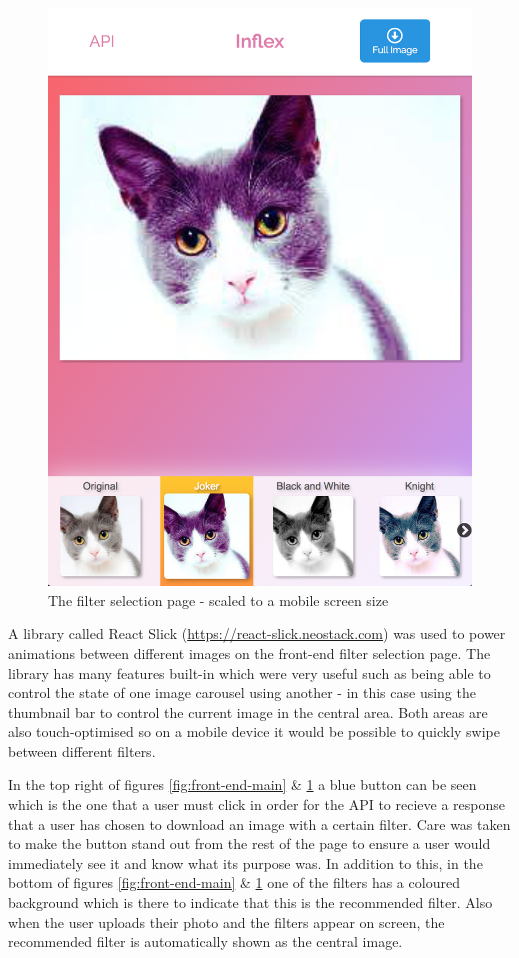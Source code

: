 \documentclass[a4paper,12pt]{report}
\begin{document}
    \begin{figure}[h]
      \centering
      \includegraphics[width=0.5\linewidth]{front-end-mobile}
      \caption{The filter selection page - scaled to a mobile screen size}
      \label{fig:front-end-mobile}
    \end{figure}

    A library called React Slick (\url{https://react-slick.neostack.com}) was used to power animations between different images on the front-end filter selection page. The library has many features built-in which were very useful such as being able to control the state of one image carousel using another - in this case using the thumbnail bar to control the current image in the central area. Both areas are also touch-optimised so on a mobile device it would be possible to quickly swipe between different filters.

    In the top right of figures \ref{fig:front-end-main} \& \ref{fig:front-end-mobile} a blue button can be seen which is the one that a user must click in order for the API to recieve a response that a user has chosen to download an image with a certain filter. Care was taken to make the button stand out from the rest of the page to ensure a user would immediately see it and know what its purpose was. In addition to this, in the bottom of figures \ref{fig:front-end-main} \& \ref{fig:front-end-mobile} one of the filters has a coloured background which is there to indicate that this is the recommended filter. Also when the user uploads their photo and the filters appear on screen, the recommended filter is automatically shown as the central image.

    \newpage
\end{document}

